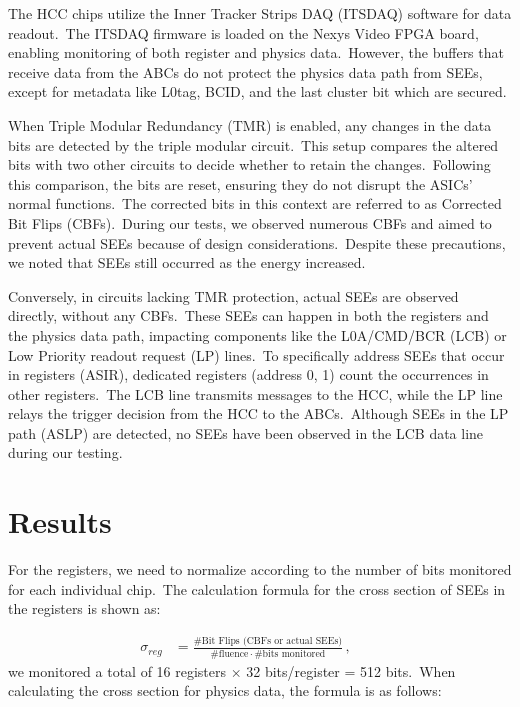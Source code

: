 \documentclass[a4paper,11pt]{article}
\begin{document}
The HCC chips utilize the Inner Tracker Strips DAQ (ITSDAQ) software for data readout.\ The ITSDAQ firmware is loaded on the Nexys Video FPGA board, enabling monitoring of both register and physics data.\ However, the buffers that receive data from the ABCs do not protect the physics data path from SEEs, except for metadata like L0tag, BCID, and the last cluster bit which are secured.

When Triple Modular Redundancy (TMR) is enabled, any changes in the data bits are detected by the triple modular circuit.\ This setup compares the altered bits with two other circuits to decide whether to retain the changes.\ Following this comparison, the bits are reset, ensuring they do not disrupt the ASICs’ normal functions.\ The corrected bits in this context are referred to as Corrected Bit Flips (CBFs).\ During our tests, we observed numerous CBFs and aimed to prevent actual SEEs because of design considerations.\ Despite these precautions, we noted that SEEs still occurred as the energy increased.

Conversely, in circuits lacking TMR protection, actual SEEs are observed directly, without any CBFs.\ These SEEs can happen in both the registers and the physics data path, impacting components like the L0A/CMD/BCR (LCB) or Low Priority readout request (LP) lines.\ To specifically address SEEs that occur in registers (ASIR), dedicated registers (address 0, 1) count the occurrences in other registers.\ The LCB line transmits messages to the HCC, while the LP line relays the trigger decision from the HCC to the ABCs.\ Although SEEs in the LP path (ASLP) are detected, no SEEs have been observed in the LCB data line during our testing.





\section{Results}
For the registers, we need to normalize according to the number of bits monitored for each individual chip.\ The calculation formula for the cross section of SEEs in the registers is shown as: 

\begin{equation}
\label{eq:x}
\begin{aligned}
\sigma_{reg} &= \frac{\#\text{Bit Flips (CBFs or actual SEEs)}}{\#\text{fluence} \cdot \#\text{bits monitored}} \,,
\qquad
\end{aligned}
\end{equation}
we monitored a total of 16 registers $\times$ 32 bits/register = 512 bits.\ When calculating the cross section for physics data, the formula is as follows:
\end{document}
